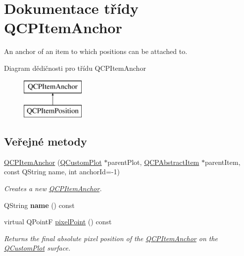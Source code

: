 \hypertarget{classQCPItemAnchor}{}\section{Dokumentace třídy Q\+C\+P\+Item\+Anchor}
\label{classQCPItemAnchor}


An anchor of an item to which positions can be attached to.  


Diagram dědičnosti pro třídu Q\+C\+P\+Item\+Anchor\begin{figure}[H]
\begin{center}
\leavevmode
\includegraphics[height=2.000000cm]{classQCPItemAnchor}
\end{center}
\end{figure}
\subsection*{Veřejné metody}
\begin{DoxyCompactItemize}
\item 
\hyperlink{classQCPItemAnchor_aeb6b681d2bf324db40a915d32ec5624f}{Q\+C\+P\+Item\+Anchor} (\hyperlink{classQCustomPlot}{Q\+Custom\+Plot} $\ast$parent\+Plot, \hyperlink{classQCPAbstractItem}{Q\+C\+P\+Abstract\+Item} $\ast$parent\+Item, const Q\+String name, int anchor\+Id=-\/1)
\begin{DoxyCompactList}\small\item\em Creates a new \hyperlink{classQCPItemAnchor}{Q\+C\+P\+Item\+Anchor}. \end{DoxyCompactList}\item 
\hypertarget{classQCPItemAnchor_ac93984042a58c875e76847dc3e5f75fe}{}Q\+String {\bfseries name} () const \label{classQCPItemAnchor_ac93984042a58c875e76847dc3e5f75fe}

\item 
virtual Q\+Point\+F \hyperlink{classQCPItemAnchor_ae92def8f9297c5d73f5806c586517bb3}{pixel\+Point} () const 
\begin{DoxyCompactList}\small\item\em Returns the final absolute pixel position of the \hyperlink{classQCPItemAnchor}{Q\+C\+P\+Item\+Anchor} on the \hyperlink{classQCustomPlot}{Q\+Custom\+Plot} surface. \end{DoxyCompactList}\end{DoxyCompactItemize}
